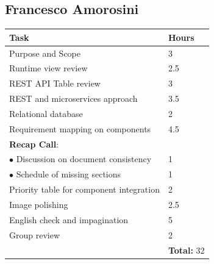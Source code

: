 \documentclass{report}
\begin{document}
\subsection*{Francesco Amorosini}
\begin{table}[!ht]
	\begin{tabular}{|C{.60\textwidth}||C{.20\textwidth}|}
		\toprule
        \textbf{Task} & \textbf{Hours}\\
        \midrule
        Purpose and Scope & 3\\
        \midrule
        Runtime view review & 2.5\\
        \midrule
		REST API Table review & 3\\
        \midrule
        REST and microservices approach & 3.5\\
        \midrule
        Relational database & 2\\
        \midrule
        Requirement mapping on components & 4.5 \\
		\midrule
		\small{\textbf{Recap Call}}: & \\
		\vspace{.2mm}
		$\bullet$ Discussion on document consistency & \vspace{.2mm} 1\\
        $\bullet$ Schedule of missing sections & 1\\
        \midrule
        Priority table for component integration & 2\\
        \midrule
        Image polishing & 2.5 \\
        \midrule
        English check and impagination & 5 \\
        \midrule
        Group review & 2\\
        \midrule
		& \textbf{Total:} 32\\
		\bottomrule
	\end{tabular}
\end{table}
\clearpage
\end{document}
